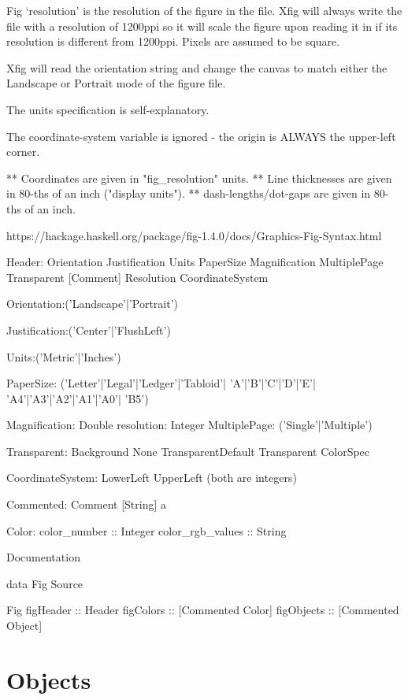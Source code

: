 \documentclass[10pt, a4paper]{article}
\begin{document}
 Fig `resolution' is the resolution of the figure in the file.
    Xfig will always write the file with a resolution of 1200ppi so it
    will scale the figure upon reading it in if its resolution is different
    from 1200ppi.  Pixels are assumed to be square.

    Xfig will read the orientation string and change the canvas to match
    either the Landscape or Portrait mode of the figure file.

    The units specification is self-explanatory.

    The coordinate-system variable is ignored - the origin is ALWAYS the
    upper-left corner.

    ** Coordinates are given in "fig\_resolution" units.
    ** Line thicknesses are given in 80-ths of an inch ("display units").
    ** dash-lengths/dot-gaps are given in 80-ths of an inch.


https://hackage.haskell.org/package/fig-1.4.0/docs/Graphics-Fig-Syntax.html



Header:
Orientation
Justification
Units
PaperSize
Magnification
MultiplePage
Transparent
[Comment]
Resolution
CoordinateSystem

Orientation:('Landscape'|'Portrait')

Justification:('Center'|'FlushLeft')

Units:('Metric'|'Inches')

PaperSize:
('Letter'|'Legal'|'Ledger'|'Tabloid'|
'A'|'B'|'C'|'D'|'E'|
'A4'|'A3'|'A2'|'A1'|'A0'|
'B5')

Magnification: Double
resolution: Integer
MultiplePage: ('Single'|'Multiple')


Transparent:
Background	 
None	 
TransparentDefault	 
Transparent ColorSpec	 


CoordinateSystem:
LowerLeft	 
UpperLeft	 
(both are integers)

Commented:
Comment [String] a	 


Color:
color\_number :: Integer
color\_rgb\_values :: String


Documentation

data Fig
Source

Fig	 
figHeader :: Header
figColors :: [Commented Color]
figObjects :: [Commented Object]


\section{Objects}\label{sec:obj}
\end{document}
